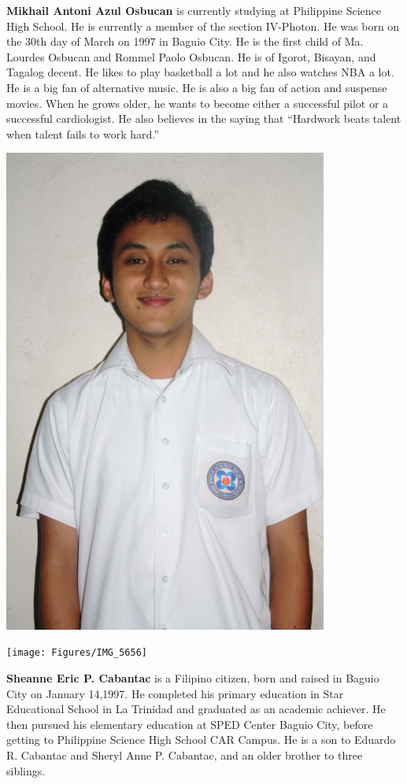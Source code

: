 {\noindent
\begin{minipage}{0.68\textwidth}
\textbf{Mikhail Antoni Azul Osbucan} is currently studying at Philippine Science High School. He is currently a member of  the section IV-Photon. He was born on the 30th day of March on 1997 in Baguio City. He is the first child of Ma. Lourdes Osbucan and Rommel Paolo Osbucan. He is of Igorot, Bisayan, and Tagalog decent. He likes to play basketball a lot and he also watches NBA a lot. He is a big fan of alternative music. He is also a big fan of action and suspense movies. When he grows older, he wants to become either a successful pilot or a successful cardiologist. He also believes in the saying that “Hardwork beats talent when talent fails to work hard.” 
\end{minipage}\hfill
\begin{minipage}{0.3\textwidth}\raggedleft
\includegraphics[width=0.8\textwidth]{Figures/IMG_5287}
\end{minipage}

\vfill

\noindent
\begin{minipage}{0.3\textwidth}
\texttt{[image: Figures/IMG\_5656]}
\end{minipage}\hfill
\begin{minipage}{0.68\textwidth}
\textbf{Sheanne Eric P. Cabantac} is a Filipino citizen, born and raised in Baguio City on January 14,1997. He completed his primary education in Star Educational School in La Trinidad and graduated as an academic achiever. He then pursued his elementary education at SPED Center Baguio City, before getting to Philippine Science High School CAR Campus. He is a son to Eduardo R. Cabantac and Sheryl Anne P. Cabantac, and an older brother to three siblings.
\end{minipage}}
